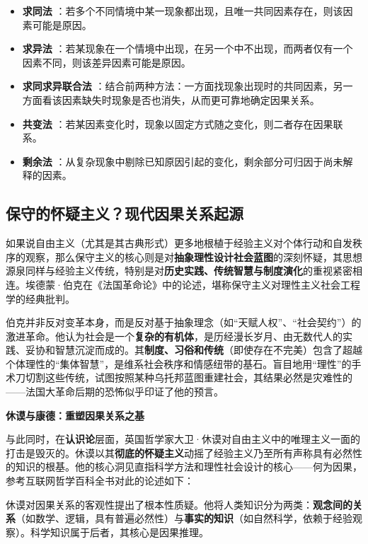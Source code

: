 \vspace{0.8em} %
\begin{itemize}
	\item
	\textbf{求同法}
	：若多个不同情境中某一现象都出现，且唯一共同因素存在，则该因素可能是原因。
	\item
	\textbf{求异法}
	：若某现象在一个情境中出现，在另一个中不出现，而两者仅有一个因素不同，则该差异因素可能是原因。
	\item
	\textbf{求同求异联合法}
	：结合前两种方法：一方面找现象出现时的共同因素，另一方面看该因素缺失时现象是否也消失，从而更可靠地确定因果关系。
	\item
	\textbf{共变法}
	：若某因素变化时，现象以固定方式随之变化，则二者存在因果联系。
	\item
	\textbf{剩余法}
	：从复杂现象中剔除已知原因引起的变化，剩余部分可归因于尚未解释的因素。
\end{itemize}

\subsection{保守的怀疑主义？现代因果关系起源}

如果说自由主义（尤其是其古典形式）更多地根植于经验主义对个体行动和自发秩序的观察，那么保守主义的核心则是对\textbf{抽象理性设计社会蓝图}的深刻怀疑，其思想源泉同样与经验主义传统，特别是对\textbf{历史实践、传统智慧与制度演化}的重视紧密相连。埃德蒙·伯克在《法国革命论》中的论述，堪称保守主义对理性主义社会工程学的经典批判。

伯克并非反对变革本身，而是反对基于抽象理念（如“天赋人权”、“社会契约”）的激进革命。他认为社会是一个\textbf{复杂的有机体}，是历经漫长岁月、由无数代人的实践、妥协和智慧沉淀而成的。其\textbf{制度、习俗和传统}（即使存在不完美）包含了超越个体理性的“集体智慧”，是维系社会秩序和情感纽带的基石。盲目地用“理性”的手术刀切割这些传统，试图按照某种乌托邦蓝图重建社会，其结果必然是灾难性的------法国大革命后期的恐怖似乎印证了他的预言。

\textbf{休谟与康德：重塑因果关系之基}

与此同时，在\textbf{认识论}层面，英国哲学家大卫·休谟对自由主义中的唯理主义一面的打击是毁灭的。休谟以其\textbf{彻底的怀疑主义}动摇了经验主义乃至所有声称具有必然性的知识的根基。他的核心洞见直指科学方法和理性社会设计的核心------何为因果，参考互联网哲学百科全书对此的论述如下：\textsuperscript{\cite{5}}

休谟对因果关系的客观性提出了根本性质疑。他将人类知识分为两类：\textbf{观念间的关系}（如数学、逻辑，具有普遍必然性）与\textbf{事实的知识}（如自然科学，依赖于经验观察）。科学知识属于后者，其核心是因果推理。

